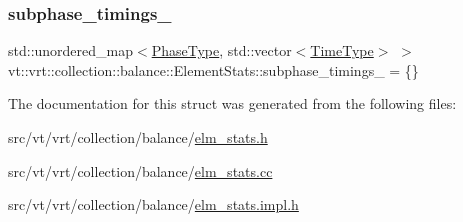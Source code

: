 \mbox{\label{structvt_1_1vrt_1_1collection_1_1balance_1_1_element_stats_a7e50111243418cbad1559c01feb2238a}} 
\subsubsection{\texorpdfstring{subphase\+\_\+timings\+\_\+}{subphase\_timings\_}}
{\footnotesize\ttfamily std\+::unordered\+\_\+map$<$\hyperlink{namespacevt_a46ce6733d5cdbd735d561b7b4029f6d7}{Phase\+Type}, std\+::vector$<$\hyperlink{namespacevt_a876a9d0cd5a952859c72de8a46881442}{Time\+Type}$>$ $>$ vt\+::vrt\+::collection\+::balance\+::\+Element\+Stats\+::subphase\+\_\+timings\+\_\+ = \{\}\hspace{0.3cm}{\ttfamily [protected]}}



The documentation for this struct was generated from the following files\+:\begin{DoxyCompactItemize}
\item 
src/vt/vrt/collection/balance/\hyperlink{elm__stats_8h}{elm\+\_\+stats.\+h}\item 
src/vt/vrt/collection/balance/\hyperlink{elm__stats_8cc}{elm\+\_\+stats.\+cc}\item 
src/vt/vrt/collection/balance/\hyperlink{elm__stats_8impl_8h}{elm\+\_\+stats.\+impl.\+h}\end{DoxyCompactItemize}
